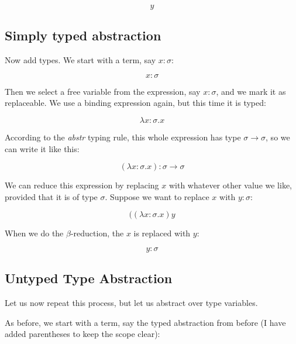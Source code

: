 \documentclass{book}
\numberwithin{equation}{chapter}
\begin{document}
\begin{equation}
y
\end{equation}


\subsection{Simply typed abstraction}

Now add types. We start with a term, say $x : \sigma$:

\begin{equation}
x : \sigma
\end{equation}

\noindent
Then we select a free variable from the expression, say $x : \sigma$, and we mark it as replaceable. We use a binding expression again, but this time it is typed:

\begin{equation}
\lambda x : \sigma.x
\end{equation}

\noindent
According to the \textit{abstr} typing rule, this whole expression has type $\sigma \rightarrow \sigma$, so we can write it like this:

\begin{equation}
(\lambda x : \sigma.x) : \sigma \rightarrow \sigma
\end{equation}

\noindent
We can reduce this expression by replacing $x$ with whatever other value we like, provided that it is of type $\sigma$. Suppose we want to replace $x$ with $y : \sigma$:

\begin{equation}
((\lambda x : \sigma.x) y
\end{equation}

\noindent
When we do the $\beta$-reduction, the $x$ is replaced with $y$:

\begin{equation}
y : \sigma
\end{equation}


\subsection{Untyped Type Abstraction}

Let us now repeat this process, but let us abstract over type variables. 

As before, we start with a term, say the typed abstraction from before (I have added parentheses to keep the scope clear):
\end{document}
